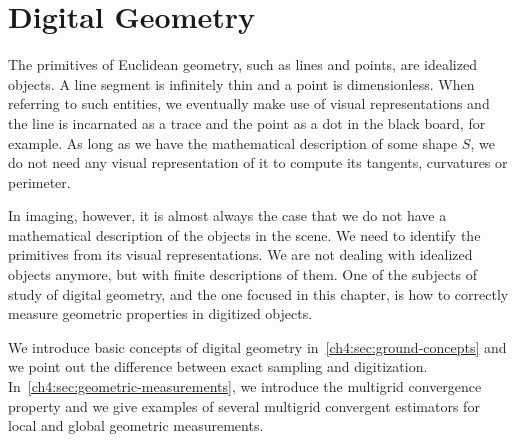 \chapter{Digital Geometry}
\label{chapter:digital-geometry}

The primitives of Euclidean geometry, such as lines and points, are idealized objects. A line segment is infinitely thin and a point is dimensionless. When referring to such entities, we eventually make use of visual representations and the line is incarnated as a trace and the point as a dot in the black board, for example. As long as we have the mathematical description of some shape $S$, we do not need any visual representation of it to compute its tangents, curvatures or perimeter. 

In imaging, however, it is almost always the case that we do not have a mathematical description of the objects in the scene. We need to identify the primitives from its visual representations.  We are not dealing with idealized objects anymore, but with finite descriptions of them. One of the subjects of study of digital geometry, and the one focused in this chapter, is how to correctly measure geometric properties in digitized objects.

We introduce basic concepts of digital geometry in~\cref{ch4:sec:ground-concepts} and we point out the difference between exact sampling and digitization. In~\cref{ch4:sec:geometric-measurements}, we introduce the multigrid convergence property and we give examples of several multigrid convergent estimators for local and global geometric measurements.

%


